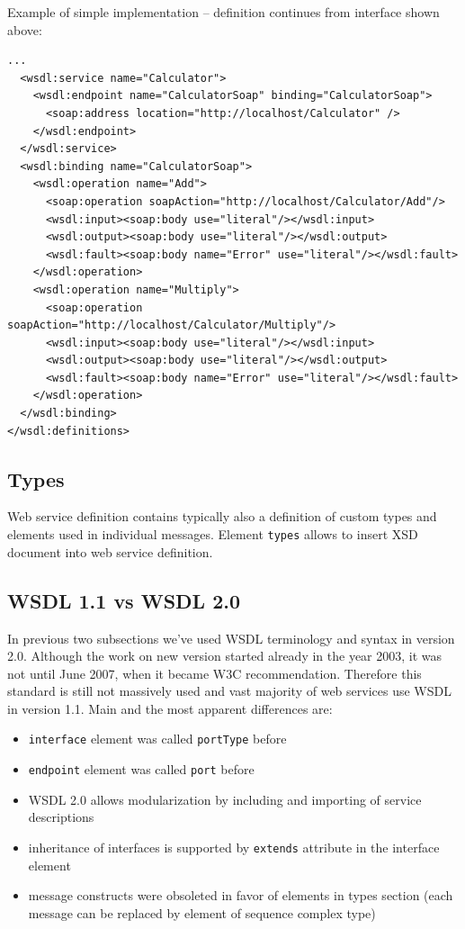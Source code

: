 \documentclass[12pt,notitlepage]{report}
\begin{document}
Example of simple implementation -- definition continues from interface shown above:
\begin{small}
\begin{verbatim}
...
  <wsdl:service name="Calculator">
    <wsdl:endpoint name="CalculatorSoap" binding="CalculatorSoap">
      <soap:address location="http://localhost/Calculator" />
    </wsdl:endpoint>
  </wsdl:service>
  <wsdl:binding name="CalculatorSoap">
    <wsdl:operation name="Add">
      <soap:operation soapAction="http://localhost/Calculator/Add"/>
      <wsdl:input><soap:body use="literal"/></wsdl:input>
      <wsdl:output><soap:body use="literal"/></wsdl:output>
      <wsdl:fault><soap:body name="Error" use="literal"/></wsdl:fault>
    </wsdl:operation>
    <wsdl:operation name="Multiply">
      <soap:operation soapAction="http://localhost/Calculator/Multiply"/>
      <wsdl:input><soap:body use="literal"/></wsdl:input>
      <wsdl:output><soap:body use="literal"/></wsdl:output>
      <wsdl:fault><soap:body name="Error" use="literal"/></wsdl:fault>
    </wsdl:operation>
  </wsdl:binding>
</wsdl:definitions>
\end{verbatim}
\end{small}

\subsection{Types}
Web service definition contains typically also a definition of custom types and elements used in individual messages. Element \texttt{types} allows to insert XSD document into web service definition.

\subsection{WSDL 1.1 vs WSDL 2.0}
\label{wsdl-versions}
In previous two subsections we've used WSDL terminology and syntax in version 2.0\cite{w3c-wsdl2}. Although the work on new version started already in the year 2003, it was not until June 2007, when it became W3C recommendation. Therefore this standard is still not massively used and vast majority of web services use WSDL in version 1.1\cite{w3c-wsdl}. Main and the most apparent differences are:
\begin{itemize}
 \item \texttt{interface} element was called \texttt{portType} before
 \item \texttt{endpoint} element was called \texttt{port} before
 \item WSDL 2.0 allows modularization by including and importing of service descriptions
 \item inheritance of interfaces is supported by \texttt{extends} attribute in the interface element
 \item message constructs were obsoleted in favor of elements in types section (each message can be replaced by element of sequence complex type)
\end{itemize}
\end{document}

